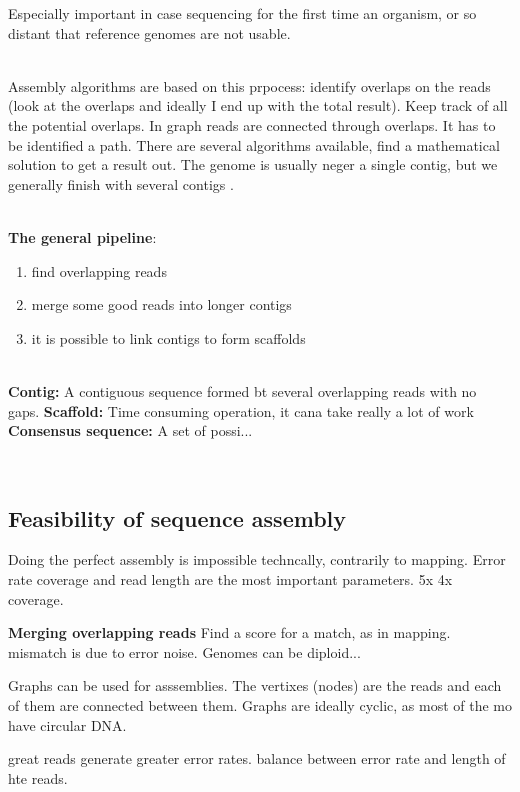 Especially important in case sequencing for the first time an organism, or so distant that reference genomes are not usable.

\\

Assembly algorithms are based on this prpocess: identify overlaps on the reads (look at the overlaps and ideally I end up with the total result). Keep track of all the potential overlaps. In graph reads are connected through overlaps. It has to be identified a path. There are several algorithms available, find a mathematical solution to get a result out. The genome is usually neger a single contig, but we generally finish with several contigs .

\\

\textbf{The general pipeline}:
\begin{enumerate}
\item find overlapping reads
\item merge some good reads into longer contigs
\item it is possible to link contigs to form scaffolds
\end{enumerate}

\\

\textbf{Contig:} A contiguous sequence formed bt several overlapping reads with no gaps.
\textbf{Scaffold:} Time consuming operation, it cana take really a lot of work
\textbf{Consensus sequence:} A set of possi...

\\

\subsection{Feasibility of sequence assembly}
Doing the perfect assembly is impossible techncally, contrarily to mapping. Error rate coverage and read length are the most important parameters. 5x 4x coverage.




\textbf{Merging overlapping reads}
Find a score for a match, as in mapping. mismatch is due to error noise. Genomes can be diploid...

Graphs can be used for asssemblies. The vertixes (nodes) are the reads and each of them are connected between them. Graphs are ideally cyclic, as most of the mo have circular DNA. 


great reads generate greater error rates. balance between error rate and length of hte reads. 


